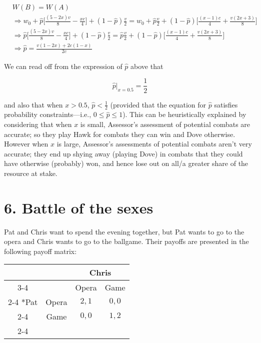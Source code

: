 \documentclass{article}
\begin{document}
\begin{align*}
    &W(B) = W(A) \\
    &\Rightarrow
        w_0 + \hat{p} \Big[\frac{(5 - 2 x) v}{8} - \frac{x c}{4}\Big]
        + (1 - \hat{p}) \frac{v}{2}
        =
        w_0 + \hat{p} \frac{v}{2}
        + (1 - \hat{p}) \Big[\frac{(x - 1) c}{4} + \frac{v (2 x + 3)}{8}\Big] \\
    &\Rightarrow
        \hat{p} \Big[\frac{(5 - 2 x) v}{8} - \frac{x c}{4}\Big]
        + (1 - \hat{p}) \frac{v}{2}
        =
        \hat{p} \frac{v}{2}
        + (1 - \hat{p}) \Big[\frac{(x - 1) c}{4} + \frac{v (2 x + 3)}{8}\Big] \\
    &\Rightarrow \hat{p} = \frac{v (1 - 2 x) + 2 c (1 - x)}{2 c}
\end{align*}

We can read off from the expression of $\hat{p}$ above that

\begin{equation*}
    \hat{p}\bigr|_{x=0.5} = \frac{1}{2}
\end{equation*}

and also that when $x > 0.5$, $\hat{p} < \frac{1}{2}$ (provided that the
equation for $\hat{p}$ satisfies probability constraints---i.e., $0 \leq
\hat{p} \leq 1$). This can be heuristically explained by considering
that when $x$ is small, Assessor's assessment of potential combats are
accurate; so they play Hawk for combats they can win and Dove otherwise.
However when $x$ is large, Assessor's assessments of potential combats
aren't very accurate; they end up shying away (playing Dove) in combats
that they could have otherwise (probably) won, and hence lose out on
all/a greater share of the resource at stake.

\section*{6. Battle of the sexes}

Pat and Chris want to spend the evening together, but Pat wants to go to
the opera and Chris wants to go to the ballgame. Their payoffs are
presented in the following payoff matrix:

\begin{center}
\setlength{\extrarowheight}{2pt}
\begin{tabular}{*{4}{c|}}
    \multicolumn{2}{c}{} & \multicolumn{2}{c}{Chris}\\\cline{3-4}
    \multicolumn{1}{c}{} &  & Opera & Game \\\cline{2-4}
    \multirow{2}*{Pat} & Opera & $2,1$ & $0,0$ \\\cline{2-4}
      & Game & $0,0$ & $1,2$ \\\cline{2-4}
\end{tabular}
\end{center}
\end{document}
